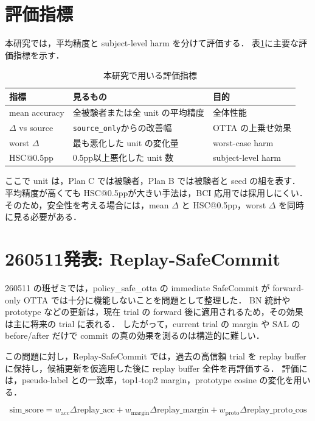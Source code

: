 \documentclass[a4paper,11pt]{ltjsarticle}
\makeatletter
\newcommand{\source}{\texttt{source\_only}}
\newcommand{\hsc}{HSC@0.5pp}
\makeatother
\begin{document}
\section{評価指標}

本研究では，平均精度と subject-level harm を分けて評価する．
表\ref{tab:metrics}に主要な評価指標を示す．

\begin{table}[h]
  \centering
  \caption{本研究で用いる評価指標}
  \label{tab:metrics}
  \begin{tabular}{lll}
    \toprule
    指標 & 見るもの & 目的 \\
    \midrule
    mean accuracy & 全被験者または全 unit の平均精度 & 全体性能 \\
    $\Delta$ vs source & \source からの改善幅 & OTTA の上乗せ効果 \\
    worst $\Delta$ & 最も悪化した unit の変化量 & worst-case harm \\
    \hsc & 0.5pp以上悪化した unit 数 & subject-level harm \\
    \bottomrule
  \end{tabular}
\end{table}

ここで unit は，Plan C では被験者，Plan B では被験者と seed の組を表す．
平均精度が高くても \hsc が大きい手法は，BCI 応用では採用しにくい．
そのため，安全性を考える場合には，mean $\Delta$ と \hsc，worst $\Delta$ を同時に見る必要がある．

\section{260511発表: Replay-SafeCommit}

260511 の班ゼミでは，policy\_safe\_otta の immediate SafeCommit が forward-only OTTA では十分に機能しないことを問題として整理した．
BN 統計や prototype などの更新は，現在 trial の forward 後に適用されるため，その効果は主に将来の trial に表れる．
したがって，current trial の margin や SAL の before/after だけで commit の真の効果を測るのは構造的に難しい．

この問題に対し，Replay-SafeCommit では，過去の高信頼 trial を replay buffer に保持し，候補更新を仮適用した後に replay buffer 全件を再評価する．
評価には，pseudo-label との一致率，top1-top2 margin，prototype cosine の変化を用いる．

\[
  \mathrm{sim\_score}
  = w_{\mathrm{acc}}\Delta \mathrm{replay\_acc}
  + w_{\mathrm{margin}}\Delta \mathrm{replay\_margin}
  + w_{\mathrm{proto}}\Delta \mathrm{replay\_proto\_cos}
\]
\end{document}
